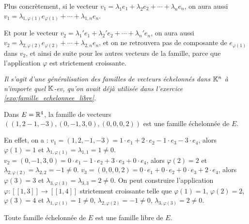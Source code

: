 \documentclass[12pt, a4paper]{report}
\begin{document}
Plus concrètement, si le vecteur $v_1 = \lambda_1 e_1 + \lambda_2 e_2 + \cdots + \lambda_n e_n$, on aura aussi $v_1 = \lambda_{1,\varphi(1)} e_{\varphi(1)} + \cdots + \lambda_{1,n} e_n$.

Et pour le vecteur $v_2 = \lambda_1' e_1 + \lambda_2' e_2 + \cdots + \lambda_n' e_n$, on aura aussi $v_2 = \lambda_{2,\varphi(2)} e_{\varphi(2)} + \cdots + \lambda_{2,n} e_n$, et on ne retrouvera pas de composante de $e_{\varphi(1)}$ dans $v_2$, et ainsi de suite pour les autres vecteurs de la famille, parce que l'application $\varphi$ est strictement croissante.

\textit{Il s'agit d'une généralisation des familles de vecteurs échelonnés dans $\mathbb{K}^n$ à n'importe quel $\mathbb{K}$-ev, qu'on avait déjà utilisée dans l'exercice \ref{exo:famille_echelonnee_libre}.}

\begin{example}
    Dans $E = \mathbb{R}^4$, la famille de vecteurs $((1,2-1,-3),(0,-1,3,0),(0,0,0,2))$ est une famille échelonnée de $E$.

    \begin{outline}
        \1 En effet, on a :
        \2 $v_1 = (1,2,-1,-3) = 1\cdot e_1 + 2\cdot e_2 - 1\cdot e_3 - 3\cdot e_4$, alors $\varphi(1) = 1$ et $\lambda_{1,\varphi(1)} = \lambda_{1,1} = 1 \ne 0$.
        \2 $v_2 = (0,-1,3,0) = 0\cdot e_1 - 1\cdot e_2 + 3\cdot e_3 + 0\cdot e_4$, alors $\varphi(2) = 2$ et $\lambda_{2,\varphi(2)} = \lambda_{2,2} = -1 \ne 0$.
        \2 $v_3 = (0,0,0,2) = 0\cdot e_1 + 0\cdot e_2 + 0\cdot e_3 + 2\cdot e_4$, alors $\varphi(3) = 3$ et $\lambda_{3,\varphi(3)} = \lambda_{3,3} = 2 \ne 0$.
        \1 On peut construire l'application $\varphi : [\![1,3]\!] \to [\![1,4]\!]$ strictement croissante telle que $\varphi(1) = 1$, $\varphi(2) = 2$, $\varphi(3) = 4$ et $\lambda_{1,\varphi(1)} = 1 \ne 0$, $\lambda_{2,\varphi(2)} = -1 \ne 0$, $\lambda_{3,\varphi(3)} = 2 \ne 0$.
    \end{outline}
\end{example}

\begin{property}
    Toute famille échelonnée de $E$ est une famille libre de $E$.
\end{property}
\end{document}
